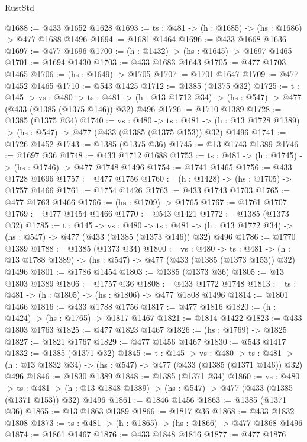 \begin{lexlean}{RustStd}
\begin{coremodule}
{\begin{coremodule}
{{{{{{{@1688 := @433 @1652 @1628
@1693 := {ts : @481} -> (h : @1685) -> (hs : @1686) -> @477 @1688 @1496
@1694 := @1681 @1464
@1696 := @433 @1668 @1636
@1697 := @477 @1696
@1700 := (h : @1432) -> (hs : @1645) -> @1697 @1465
@1701 := @1694 @1430
@1703 := @433 @1683 @1643
@1705 := @477 @1703 @1465
@1706 := (hs : @1649) -> @1705
@1707 := @1701 @1647
@1709 := @477 @1452 @1465
@1710 := @543 @1425
@1712 := @1385 (@1375 @32)
@1725 := {t : @145} ->
  {vs : @480} ->
  {ts : @481} -> (h : @13 @1712 @34) -> (hs : @547) -> @477 (@433 (@1385 (@1375 @146)) @32) @496
@1726 := @1710 @1389
@1728 := @1385 (@1375 @34)
@1740 := {vs : @480} ->
  {ts : @481} -> (h : @13 @1728 @1389) -> (hs : @547) -> @477 (@433 (@1385 (@1375 @153)) @32) @1496
@1741 := @1726 @1452
@1743 := @1385 (@1375 @36)
@1745 := @13 @1743 @1389
@1746 := @1697 @36
@1748 := @433 @1712 @1688
@1753 := {ts : @481} -> (h : @1745) -> (hs : @1746) -> @477 @1748 @1496
@1754 := @1741 @1465
@1756 := @433 @1728 @1696
@1757 := @477 @1756
@1760 := (h : @1428) -> (hs : @1705) -> @1757 @1466
@1761 := @1754 @1426
@1763 := @433 @1743 @1703
@1765 := @477 @1763 @1466
@1766 := (hs : @1709) -> @1765
@1767 := @1761 @1707
@1769 := @477 @1454 @1466
@1770 := @543 @1421
@1772 := @1385 (@1373 @32)
@1785 := {t : @145} ->
  {vs : @480} ->
  {ts : @481} -> (h : @13 @1772 @34) -> (hs : @547) -> @477 (@433 (@1385 (@1373 @146)) @32) @496
@1786 := @1770 @1389
@1788 := @1385 (@1373 @34)
@1800 := {vs : @480} ->
  {ts : @481} -> (h : @13 @1788 @1389) -> (hs : @547) -> @477 (@433 (@1385 (@1373 @153)) @32) @1496
@1801 := @1786 @1454
@1803 := @1385 (@1373 @36)
@1805 := @13 @1803 @1389
@1806 := @1757 @36
@1808 := @433 @1772 @1748
@1813 := {ts : @481} -> (h : @1805) -> (hs : @1806) -> @477 @1808 @1496
@1814 := @1801 @1466
@1816 := @433 @1788 @1756
@1817 := @477 @1816
@1820 := (h : @1424) -> (hs : @1765) -> @1817 @1467
@1821 := @1814 @1422
@1823 := @433 @1803 @1763
@1825 := @477 @1823 @1467
@1826 := (hs : @1769) -> @1825
@1827 := @1821 @1767
@1829 := @477 @1456 @1467
@1830 := @543 @1417
@1832 := @1385 (@1371 @32)
@1845 := {t : @145} ->
  {vs : @480} ->
  {ts : @481} -> (h : @13 @1832 @34) -> (hs : @547) -> @477 (@433 (@1385 (@1371 @146)) @32) @496
@1846 := @1830 @1389
@1848 := @1385 (@1371 @34)
@1860 := {vs : @480} ->
  {ts : @481} -> (h : @13 @1848 @1389) -> (hs : @547) -> @477 (@433 (@1385 (@1371 @153)) @32) @1496
@1861 := @1846 @1456
@1863 := @1385 (@1371 @36)
@1865 := @13 @1863 @1389
@1866 := @1817 @36
@1868 := @433 @1832 @1808
@1873 := {ts : @481} -> (h : @1865) -> (hs : @1866) -> @477 @1868 @1496
@1874 := @1861 @1467
@1876 := @433 @1848 @1816
@1877 := @477 @1876
}}}}}}}
\end{coremodule}}
\end{coremodule}
\end{lexlean}
